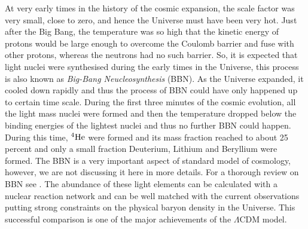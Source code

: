 \documentclass[
  11pt,
  twoside,
  openright,
  titlepage,
  headings=optiontoheadandtoc
]{scrbook}
\begin{document}
At  very early times in the history of the cosmic expansion, the scale factor 
was very small, close to zero, and hence the Universe must have been very hot. Just
after the Big Bang, the temperature was so high that the kinetic energy
of protons would be large enough to overcome the Coulomb barrier and fuse with other
protons, whereas the neutrons had no such barrier. So, it is expected that
light nuclei were synthesised during the early times in the Universe, this
process is also known as {\it Big-Bang Neucleosynthesis} (BBN). 
As the Universe expanded, 
it cooled down rapidly and thus the process of BBN could have only
happened up to certain time scale. During the first three minutes of the cosmic
evolution, all the light mass nuclei were formed and then the temperature
dropped below the binding energies of the lightest nuclei and thus no
further BBN could happen. During this time, $^4{\rm He}$ were formed and 
its mass fraction reached to about 25 percent and only a small fraction 
Deuterium, Lithium and Beryllium were formed. 
The BBN is a very important
aspect of standard model of cosmology, however, we are not discussing it here in more
details. For a thorough review on BBN
see \cite{2000PhST...85...12T,2006astro.ph..1514F}. The abundance of these light elements 
can be calculated with a nuclear reaction network and can be well matched
with the current observations putting strong constraints on the physical
baryon density in the Universe. This successful comparison is one of the major
achievements of the $\Lambda$CDM model.
\end{document}
